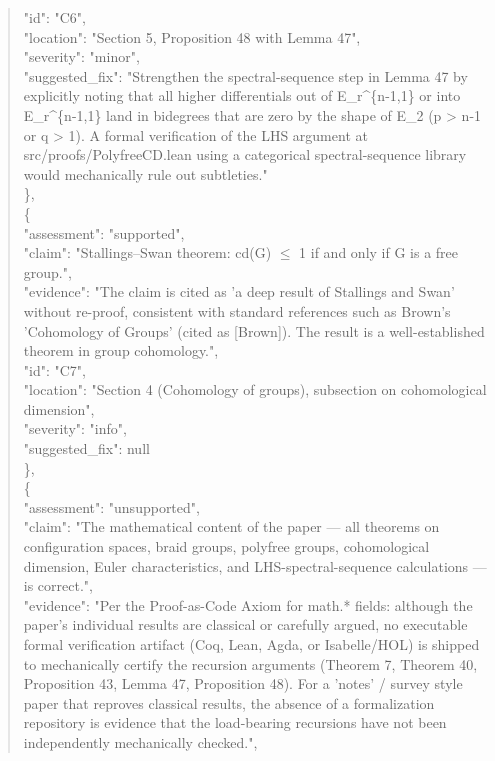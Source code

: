 \documentclass[11pt]{article}
\begin{document}
\begin{quote}
      "id": "C6",\\
      "location": "Section 5, Proposition 48 with Lemma 47",\\
      "severity": "minor",\\
      "suggested\_fix": "Strengthen the spectral-sequence step in Lemma 47 by explicitly noting that all higher differentials out of E\_r\^{}\{n-1,1\} or into E\_r\^{}\{n-1,1\} land in bidegrees that are zero by the shape of E\_2 (p > n-1 or q > 1). A formal verification of the LHS argument at src/proofs/PolyfreeCD.lean using a categorical spectral-sequence library would mechanically rule out subtleties."\\
    \},\\
    \{\\
      "assessment": "supported",\\
      "claim": "Stallings--Swan theorem: cd(G) \ensuremath{\le} 1 if and only if G is a free group.",\\
      "evidence": "The claim is cited as 'a deep result of Stallings and Swan' without re-proof, consistent with standard references such as Brown's 'Cohomology of Groups' (cited as [Brown]). The result is a well-established theorem in group cohomology.",\\
      "id": "C7",\\
      "location": "Section 4 (Cohomology of groups), subsection on cohomological dimension",\\
      "severity": "info",\\
      "suggested\_fix": null\\
    \},\\
    \{\\
      "assessment": "unsupported",\\
      "claim": "The mathematical content of the paper --- all theorems on configuration spaces, braid groups, polyfree groups, cohomological dimension, Euler characteristics, and LHS-spectral-sequence calculations --- is correct.",\\
      "evidence": "Per the Proof-as-Code Axiom for math.* fields: although the paper's individual results are classical or carefully argued, no executable formal verification artifact (Coq, Lean, Agda, or Isabelle/HOL) is shipped to mechanically certify the recursion arguments (Theorem 7, Theorem 40, Proposition 43, Lemma 47, Proposition 48). For a 'notes' / survey style paper that reproves classical results, the absence of a formalization repository is evidence that the load-bearing recursions have not been independently mechanically checked.",\\

\end{quote}
\end{document}
